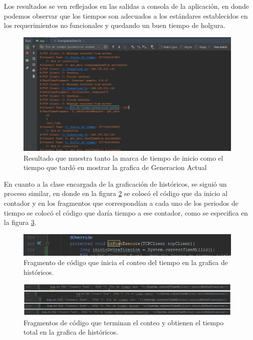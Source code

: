 Los resultados se ven reflejados en las salidas a consola de la aplicación, en donde podemos observar que los tiempos son adecuados a los estándares establecidos en los requerimientos no funcionales y quedando un buen tiempo de holgura.  \\ \newline

\begin{figure}[H]
	\centering
	\includegraphics[scale=.6]{Capitulo5/images/TiempoGraficacionGAResultado.png}
	\caption{Resultado que muestra tanto la marca de tiempo de inicio como el tiempo que tardó en mostrar la grafica de Generacion Actual}	\label{fig:Tiempo_GraficacionGAR}
\end{figure} 

En cuanto a la clase encargada de la graficación de históricos, se siguió un proceso similar, en donde en la figura \ref{fig:Tiempo_GraficacionH} se colocó el código que da inicio al contador y en los fragmentos que correspondían a cada uno de los periodos de tiempo se colocó el código que daría tiempo a ese contador, como se especifica en la figura \ref{fig:Tiempo_GraficacionH2}. \\ \newline

\begin{figure}[H]
	\centering
	\includegraphics[scale=.6]{Capitulo5/images/TiempoGraficacionHistCodigo.png}
	\caption{Fragmento de código que inicia el conteo del tiempo en la grafica de históricos.}	\label{fig:Tiempo_GraficacionH}
\end{figure} 

\begin{figure}[H]
	\centering
	\includegraphics[scale=.5]{Capitulo5/images/TiempoGraficacionHistCodigo2.png}
	\caption{Fragmentos de código que terminan el conteo y obtienen el tiempo total en la grafica de históricos.}	\label{fig:Tiempo_GraficacionH2}
\end{figure} 

